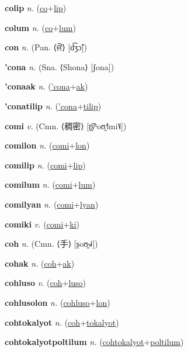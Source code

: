\textbf{\hypertarget{colip}{colip}} \textit{n.} (\hyperlink{co}{co}+\allowbreak \hyperlink{lip}{lip})


\textbf{\hypertarget{colum}{colum}} \textit{n.} (\hyperlink{co}{co}+\allowbreak \hyperlink{lum}{lum})


\textbf{\hypertarget{con}{con}} \textit{n.} (Pan. ⟨{\gurmukhi{}ਜੌਂ}⟩ [d͡ʒɔ̃])


\textbf{\hypertarget{'cona}{'cona}} \textit{n.} (Sna. ⟨Shona⟩ [ʃona])


\textbf{\hypertarget{'conaak}{'conaak}} \textit{n.} (\hyperlink{'cona}{'cona}+\allowbreak \hyperlink{ak}{ak})


\textbf{\hypertarget{'conatilip}{'conatilip}} \textit{n.} (\hyperlink{'cona}{'cona}+\allowbreak \hyperlink{tilip}{tilip})


\textbf{\hypertarget{comi}{comi}} \textit{v.} (Cmn. ⟨{\chinese{}稠密}⟩ [ʈ͡ʂʰoʊ̯˧˥mi˥˩])


\textbf{\hypertarget{comilon}{comilon}} \textit{n.} (\hyperlink{comi}{comi}+\allowbreak \hyperlink{lon}{lon})


\textbf{\hypertarget{comilip}{comilip}} \textit{n.} (\hyperlink{comi}{comi}+\allowbreak \hyperlink{lip}{lip})


\textbf{\hypertarget{comilum}{comilum}} \textit{n.} (\hyperlink{comi}{comi}+\allowbreak \hyperlink{lum}{lum})


\textbf{\hypertarget{comilyan}{comilyan}} \textit{n.} (\hyperlink{comi}{comi}+\allowbreak \hyperlink{lyan}{lyan})


\textbf{\hypertarget{comiki}{comiki}} \textit{v.} (\hyperlink{comi}{comi}+\allowbreak \hyperlink{ki}{ki})


\textbf{\hypertarget{coh}{coh}} \textit{n.} (Cmn. ⟨{\chinese{}手}⟩ [ʂoʊ̯˧˩˧])


\textbf{\hypertarget{cohak}{cohak}} \textit{n.} (\hyperlink{coh}{coh}+\allowbreak \hyperlink{ak}{ak})


\textbf{\hypertarget{cohluso}{cohluso}} \textit{v.} (\hyperlink{coh}{coh}+\allowbreak \hyperlink{luso}{luso})


\textbf{\hypertarget{cohlusolon}{cohlusolon}} \textit{n.} (\hyperlink{cohluso}{cohluso}+\allowbreak \hyperlink{lon}{lon})


\textbf{\hypertarget{cohtokalyot}{cohtokalyot}} \textit{n.} (\hyperlink{coh}{coh}+\allowbreak \hyperlink{tokalyot}{tokalyot})


\textbf{\hypertarget{cohtokalyotpoltilum}{cohtokalyotpoltilum}} \textit{n.} (\hyperlink{cohtokalyot}{cohtokalyot}+\allowbreak \hyperlink{poltilum}{poltilum})



